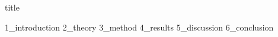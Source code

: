 \documentclass{article}
\begin{document}
{title}

\frontmatter

\begin{abstract}
    {0_abstract}
\end{abstract}
\clearpage


\tableofcontents

\listoffigures
\listoftables

\mainmatter


{1_introduction}
{2_theory}
{3_method}
{4_results}
{5_discussion}
{6_conclusion}

\newpage



\addappendix

\end{document}

